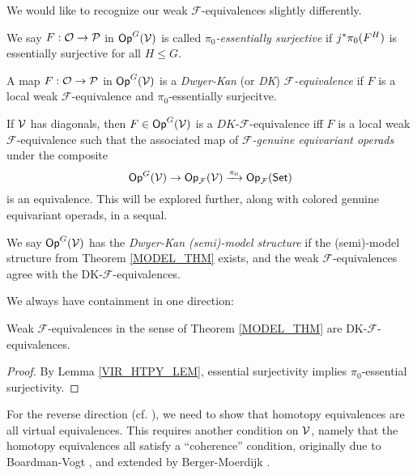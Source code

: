 \documentclass[a4paper,10pt
,draft
]{article}%
\renewcommand{\F}{\mathcal F}
\renewcommand{\1}{\eta}%
\begin{document}
We would like to recognize our weak $\F$-equivalences slightly differently.

\begin{definition}
      We say $F: \mathcal{O} \to \mathcal{P}$ in $\mathsf{Op}^G(\mathcal V)$ is called \textit{$\pi_0$-essentially surjective} if
      $j^{\**}\pi_0(F^H)$ is essentially surjective for all $H \leq G$.
      
      A map $F: \mathcal{O} \to \mathcal{P}$ in $\mathsf{Op}^G(\mathcal V)$ is a \textit{Dwyer-Kan} (or \textit{DK}) \textit{$\F$-equivalence} if
      $F$ is a local weak $\F$-equivalence and $\pi_0$-essentially surjecitve.
\end{definition}

\begin{remark}
      If $\mathcal V$ has diagonals, then $F \in \mathsf{Op}^G(\mathcal V)$ is a $DK$-$\F$-equivalence iff
      $F$ is a local weak $\F$-equivalence such that 
      the associated map of \textit{$\F$-genuine equivariant operads} under the composite
      \begin{equation}
            \Op^G(\V) \to \Op_\F(\V) \xrightarrow{\pi_0} \Op_\F(\Set) 
      \end{equation}
      is an equivalence.
      This will be explored further, along with colored genuine equivariant operads, in a sequal.
\end{remark}

\begin{definition}
      \label{DK_MODEL_DEF}
      We say $\mathsf{Op}^G(\mathcal V)$ has the \textit{Dwyer-Kan (semi)-model structure} if the (semi)-model structure from
      Theorem \ref{MODEL_THM} exists, and the weak $\F$-equivalences agree with the DK-$\F$-equivalences.
\end{definition}

We always have containment in one direction:
\begin{proposition}
      \label{WE_ARE_DK_PROP}
      Weak $\F$-equivalences in the sense of Theorem \ref{MODEL_THM} are DK-$\F$-equivalences.
\end{proposition}
\begin{proof}
      By Lemma \ref{VIR_HTPY_LEM}, essential surjectivity implies $\pi_0$-essential surjectivity. 
\end{proof}

For the reverse direction (cf. \cite[\S 2]{BM13}), we need to show that
homotopy equivalences are all virtual equivalences.
This requires another condition on $\mathcal V$, namely that the homotopy equivalences all satisfy a ``coherence'' condition,
originally due to Boardman-Vogt \cite{BV73}, and extended by Berger-Moerdijk \cite{BM13}.
\end{document}
